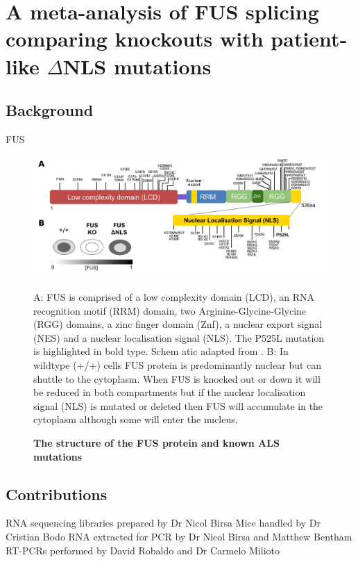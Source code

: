 \chapter{A meta-analysis of FUS splicing comparing knockouts with patient-like $\Delta$NLS mutations}
\label{chapter:fus_meta}

\section{Background}

FUS


\begin{figure}[h!]
	\centering
	\includegraphics[width=\textwidth]{Figures/06_fus_meta/FUS_structure_mutations.png}
	\caption{\textbf{The structure of the FUS protein and known ALS mutations}}
	A: FUS is comprised of a low complexity domain (LCD), an RNA recognition motif (RRM) domain, two Arginine-Glycine-Glycine (RGG) domains, a zinc finger domain (Znf), a nuclear export signal (NES) and a nuclear localisation signal (NLS). The P525L mutation is highlighted in bold type. Schem	atic adapted from \citep{Shang2016}.
	B: In wildtype (+/+) cells FUS protein is predominantly nuclear but can shuttle to the cytoplasm. When FUS is knocked out or down it will be reduced in both compartments but if the nuclear localisation signal (NLS) is mutated or deleted then FUS will accumulate in the cytoplasm although some will enter the nucleus.
	\label{fig:fus_structure}
\end{figure}




\section{Contributions}
RNA sequencing libraries prepared by Dr Nicol Birsa
Mice handled by Dr Cristian Bodo
RNA extracted for PCR by Dr Nicol Birsa and Matthew Bentham
RT-PCRs performed by David Robaldo and Dr Carmelo Milioto

